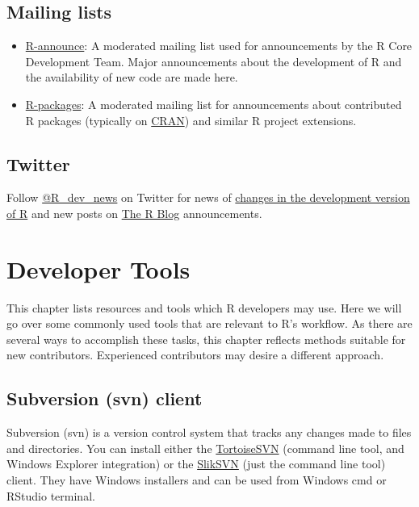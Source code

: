 \documentclass[
]{book}
\providecommand{\tightlist}{%
  \setlength{\itemsep}{0pt}\setlength{\parskip}{0pt}}
\begin{document}
\section{Mailing lists}\label{mailing-lists-1}

\begin{itemize}
\tightlist
\item
  \href{https://stat.ethz.ch/mailman/listinfo/r-announce}{R-announce}: A moderated mailing list used for announcements by the R Core Development Team. Major announcements about the development of R and the availability of new code are made here.
\item
  \href{https://stat.ethz.ch/mailman/listinfo/r-packages}{R-packages}: A moderated mailing list for announcements about contributed R packages (typically on \href{https://cran.r-project.org/}{CRAN}) and similar R project extensions.
\end{itemize}

\section{Twitter}\label{twitter}

Follow \href{https://twitter.com/R_dev_news}{@R\_dev\_news} on Twitter for news of \href{https://developer.r-project.org/RSSfeeds.html}{changes in the development version of R} and new posts on \href{https://blog.r-project.org/}{The R Blog} announcements.

\chapter{Developer Tools}\label{DevTools}

This chapter lists resources and tools which R developers may use. Here we will go over some commonly used tools that are relevant to R's workflow. As there are several ways to accomplish these tasks, this chapter reflects methods suitable for new contributors. Experienced contributors may desire a different approach.

\section{Subversion (svn) client}\label{subversion-svn-client}

Subversion (svn) is a version control system that tracks any changes made to files and directories. You can install either the \href{https://tortoisesvn.net/}{TortoiseSVN} (command line tool, and Windows Explorer integration) or the \href{https://sliksvn.com/download/}{SlikSVN} (just the command line tool) client. They have Windows installers and can be used from Windows cmd or RStudio terminal.
\end{document}
